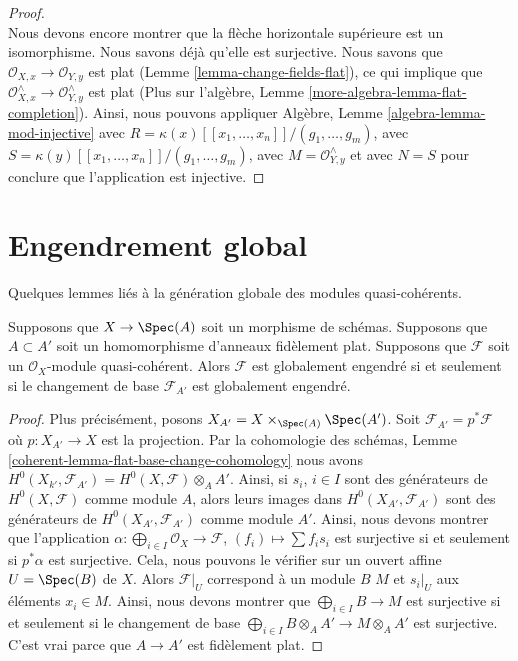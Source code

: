 \begin{proof}
$${}
$$
Nous devons encore montrer que la flèche horizontale supérieure
est un isomorphisme. Nous savons déjà qu'elle est surjective.
Nous savons que $\mathcal{O}_{X, x} \to \mathcal{O}_{Y, y}$ est
plat (Lemme \ref{lemma-change-fields-flat}), ce qui implique
que $\mathcal{O}_{X, x}^\wedge \to \mathcal{O}_{Y, y}^\wedge$
est plat (Plus sur l'algèbre, Lemme
\ref{more-algebra-lemma-flat-completion}). Ainsi, nous pouvons
appliquer Algèbre, Lemme \ref{algebra-lemma-mod-injective} avec $R =
\kappa(x)[[x_1, \ldots, x_n]]/(g_1, \ldots, g_m)$, avec $S =
\kappa(y)[[x_1, \ldots, x_n]]/(g_1, \ldots, g_m)$, avec $M =
\mathcal{O}_{Y, y}^\wedge$ et avec $N = S$ pour conclure que l'application est injective.
\end{proof}


\section{Engendrement global}
\label{section-global-generation}

\noindent
Quelques lemmes liés à la génération globale des modules quasi-cohérents.

\begin{lemma}
\label{lemma-globally-generated-base-change}
Supposons que $X \to \Spec(A)$ soit un morphisme de schémas. Supposons que $A \subset
A'$ soit un homomorphisme d'anneaux fidèlement plat. Supposons que $\mathcal{F}$ soit
un $\mathcal{O}_X$-module quasi-cohérent. Alors $\mathcal{F}$ est globalement engendré
si et seulement si le changement de base $\mathcal{F}_{A'}$ est globalement engendré.
\end{lemma}

\begin{proof}
Plus précisément, posons $X_{A'} = X \times_{\Spec(A)}
\Spec(A')$. Soit $\mathcal{F}_{A'} = p^*\mathcal{F}$ où $p :
X_{A'} \to X$ est la projection. Par la cohomologie des
schémas, Lemme
\ref{coherent-lemma-flat-base-change-cohomology} nous avons
$H^0(X_{k'}, \mathcal{F}_{A'}) = H^0(X, \mathcal{F}) \otimes_A
A'$. Ainsi, si $s_i$, $i \in I$ sont des générateurs de $H^0(X,
\mathcal{F})$ comme module $A$, alors leurs images dans
$H^0(X_{A'}, \mathcal{F}_{A'})$ sont des générateurs de
$H^0(X_{A'}, \mathcal{F}_{A'})$ comme module $A'$. Ainsi, nous
devons montrer que l'application $\alpha : \bigoplus_{i \in I}
\mathcal{O}_X \to \mathcal{F}$, $(f_i) \mapsto \sum f_i s_i$ est
surjective si et seulement si $p^*\alpha$ est surjective. Cela,
nous pouvons le vérifier sur un ouvert affine $U = \Spec(B)$ de
$X$. Alors $\mathcal{F}|_U$ correspond à un module $B$ $M$ et
$s_i|_U$ aux éléments $x_i \in M$. Ainsi, nous devons montrer que
$\bigoplus_{i \in I} B \to M$ est surjective si et seulement si le
changement de base $\bigoplus_{i \in I} B \otimes_A A' \to M \otimes_A
A'$ est surjective. C'est vrai parce que $A \to A'$ est fidèlement plat.
\end{proof}


